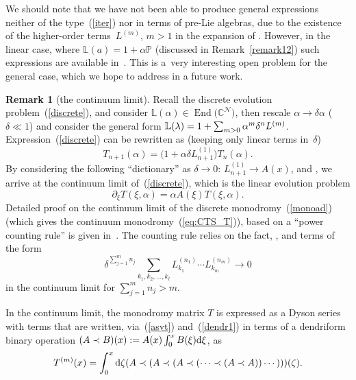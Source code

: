 \documentclass[pdftex]{sigma}
\numberwithin{equation}{section}
\theoremstyle{definition}
\newtheorem{rem}[thm]{Remark}
\DeclareMathOperator{\EEnd}{End}%
\begin{document}
We should note that we have not been able to produce general expressions neither of the type~(\ref{iter}) nor in terms of pre-Lie algebras, due to the existence of the higher-order terms~$L^{(m)}$, ${m>1}$ in the expansion of . However, in the linear case, where ${{\mathbb L}(a) = 1+ \alpha {\mathbb P}}$ (discussed in Remark~\ref{remark12}) such expressions are available in~\cite{Fer, EbraMan}. This is a~very interesting open problem for the general case, which we hope to address in a future work.

\begin{rem}[the continuum limit]\label{remcont}
Recall the discrete
evolution problem~(\ref{discrete}), and consider ${\mathbb L}(\alpha) \in \EEnd\bigl({\mathbb C}^{\mathcal N}\bigr)$,
then rescale $\alpha \to \delta \alpha$ ($\delta \ll 1 $) and consider the general form
${\mathbb L}(\lambda) = 1 + \smash{\sum_{m>0} \alpha^m \delta^n L^{(m)}}$. Expression~(\ref{discrete})
can be rewritten as (keeping only linear terms in~$\delta$)
\begin{equation*}
T_{n+1}(\alpha) = \bigl(1+ \alpha \delta L^{(1)}_{n+1} \bigr) T_n(\alpha).
\end{equation*}
By considering the following ``dictionary'' as $\delta \to 0$:
$L^{(1)}_{n+1} \to A(x)$, and ,
we arrive at the continuum limit of~(\ref{discrete}), which is the linear evolution problem
\begin{equation*}
\partial_{\xi} T(\xi, \alpha) = \alpha A(\xi) T(\xi, \alpha).
\end{equation*}
 Detailed proof on the continuum
limit of the discrete monodromy~(\ref{monoad}) (which gives the
continuum monodromy~(\ref{eq:CTS_T})), based on a ``power counting rule'' is given in~\cite{AvanDoikouSfetsos}.
The counting rule relies on the fact, , and terms of the form
\[
\delta^{\sum_{j=1}^m n_j}\sum_{k_1, k_2,\dots ,k_l} L_{k_1}^{(n_1)}\cdots L_{k_m}^{(n_{m})} \to 0
\]
in the continuum limit for $\sum_{j=1}^m n_j > m$.
\end{rem}

In the continuum limit, the monodromy matrix $T$ is expressed as a Dyson series with terms that are written, via~(\ref{asyt}) and~(\ref{dendr1}) in terms of a dendriform binary operation $ (A\prec B)(x) := \smash{A(x) \int_0^x B(\xi) {\rm d}\xi}$, as
\begin{eqnarray*}
T^{(m)}(x) =\int_{0}^x{\rm d}\zeta (A\prec (A\prec
(A\prec (\cdots \prec(A \prec A)) \cdots )))(\zeta).%
\end{eqnarray*}
\end{document}
